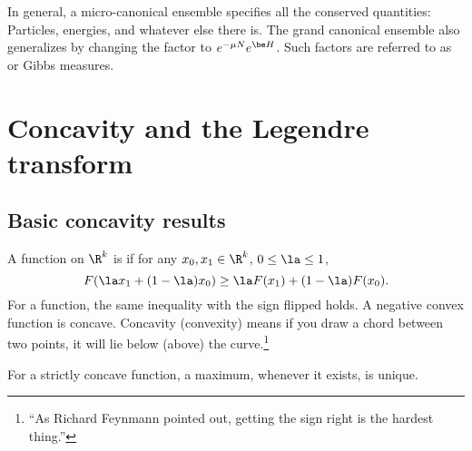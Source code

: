 In general, a micro-canonical ensemble specifies all the conserved quantities: Particles, energies, and whatever else there is. The grand canonical ensemble also generalizes by changing the factor to $e^{-\mu N} e^{\be H}$.
Such factors are referred to as  %
or Gibbs measures.

\section{Concavity and the Legendre transform}

\subsection{Basic concavity results}

\begin{df}
A function on $\R^k$ is  if for any $x_0,x_1\in \R^k$, $0\le \la \le 1$,
\[
F(\la x_1+(1-\la)x_0)\geq \la F(x_1)+(1-\la) F(x_0).
\]
For a  function, the same inequality with the sign flipped holds. A negative convex function is concave. 
Concavity (convexity) means if you draw a chord between two points, it will lie below (above) the curve.\footnote{``As Richard Feynmann pointed out, getting the sign right is the hardest thing.''}
\end{df}

For a strictly concave function, a maximum, whenever it exists, is unique.

